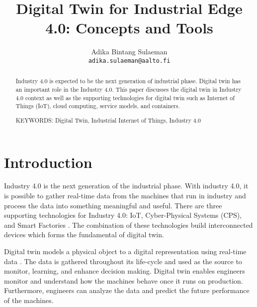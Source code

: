 \documentclass[article]{aaltoseries}
\begin{document}
 

\title{Digital Twin for Industrial Edge 4.0: Concepts and Tools}

\author{Adika Bintang Sulaeman%
\\\textnormal{\texttt{adika.sulaeman@aalto.fi}}} %


\maketitle


\begin{abstract}
  Industry 4.0 is expected to be the next generation of industrial phase. Digital twin has an important role in the Industry 4.0. This paper discusses the digital twin in Industry 4.0 context as well as the supporting technologies for digital twin such as Internet of Things (IoT), cloud computing, service models, and containers.
  
\vspace{3mm}
\noindent KEYWORDS: Digital Twin, Industrial Internet of Things, Industry 4.0

\end{abstract}




\section{Introduction}

Industry 4.0 is the next generation of the industrial phase. With industry 4.0, it is possible to gather real-time data from the machines that run in industry and process the data into something meaningful and useful. There are three supporting technologies for Industry 4.0: IoT, Cyber-Physical Systems (CPS), and Smart Factories \cite{hermann2016design}. The combination of these technologies build interconnected devices which forms the fundamental of digital twin.

Digital twin models a physical object to a digital representation using real-time data \cite{Cheatshe3:online}. The data is gathered throughout its life-cycle and used as the source to monitor, learning, and enhance decision making. Digital twin enables engineers monitor and understand how the machines behave once it runs on production. Furthermore, engineers can analyze the data and predict the future performance of the machines.
\end{document}
